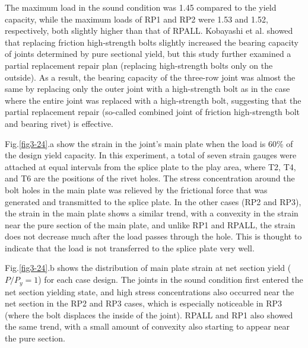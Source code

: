 The maximum load in the sound condition was 1.45 compared to the yield capacity, while the maximum loads of RP1 and RP2 were 1.53 and 1.52, respectively, both slightly higher than that of RPALL. Kobayashi et al. \cite{KOMATSU2015} showed that replacing friction high-strength bolts slightly increased the bearing capacity of joints determined by pure sectional yield, but this study further examined a partial replacement repair plan (replacing high-strength bolts only on the outside). As a result, the bearing capacity of the three-row joint was almost the same by replacing only the outer joint with a high-strength bolt as in the case where the entire joint was replaced with a high-strength bolt, suggesting that the partial replacement repair (so-called combined joint of friction high-strength bolt and bearing rivet) is effective.

Fig.\ref{fig3-24}.a show the strain in the joint's main plate when the load is 60\% of the design yield capacity. In this experiment, a total of seven strain gauges were attached at equal intervals from the splice plate to the play area, where T2, T4, and T6 are the positions of the rivet holes. The stress concentration around the bolt holes in the main plate was relieved by the frictional force that was generated and transmitted to the splice plate. In the other cases (RP2 and RP3), the strain in the main plate shows a similar trend, with a convexity in the strain near the pure section of the main plate, and unlike RP1 and RPALL, the strain does not decrease much after the load passes through the hole. This is thought to indicate that the load is not transferred to the splice plate very well.

Fig.\ref{fig3-24}.b shows the distribution of main plate strain at net section yield ($P/P_y=1$) for each case design. The joints in the sound condition first entered the net section yielding state, and high stress concentrations also occurred near the net section in the RP2 and RP3 cases, which is especially noticeable in RP3 (where the bolt displaces the inside of the joint). RPALL and RP1 also showed the same trend, with a small amount of convexity also starting to appear near the pure section.

